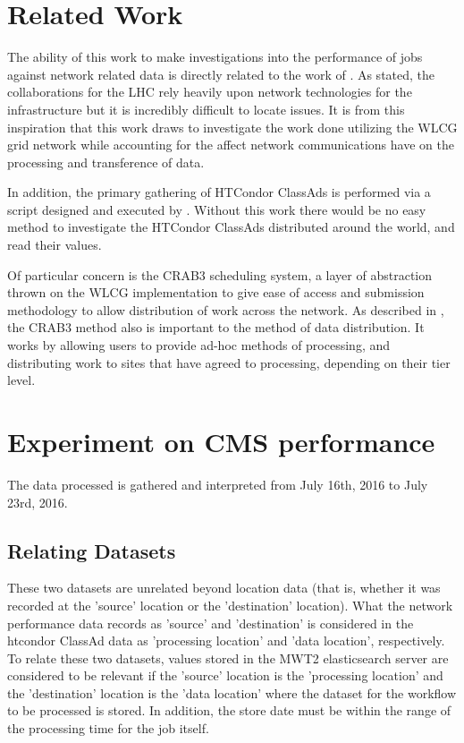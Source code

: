 \documentclass[sigconf]{acmart}
\begin{document}
\section{Related Work}
The ability of this work to make investigations into the performance of jobs against network related data is directly related to the work of \cite{shawn}. As stated, the collaborations for the LHC rely heavily upon network technologies for the infrastructure but it is incredibly difficult to locate issues. It is from this inspiration that this work draws to investigate the work done utilizing the WLCG grid network while accounting for the affect network communications have on the processing and transference of data.

In addition, the primary gathering of HTCondor ClassAds is performed via a script designed and executed by \cite{brian}. Without this work there would be no easy method to investigate the HTCondor ClassAds distributed around the world, and read their values.

Of particular concern is the CRAB3 scheduling system, a layer of abstraction thrown on the WLCG implementation to give ease of access and submission methodology to allow distribution of work across the network. As described in \cite{crab}, the CRAB3 method also is important to the method of data distribution. It works by allowing users to provide ad-hoc methods of processing, and distributing work to sites that have agreed to processing, depending on their tier level.
\section{Experiment on CMS performance}
The data processed is gathered and interpreted from July 16th, 2016 to July 23rd, 2016.
\subsection{Relating Datasets}
These two datasets are unrelated beyond location data (that is, whether it was recorded at the 'source' location or the 'destination' location). What the network performance data records as 'source' and 'destination' is considered in the htcondor ClassAd data as 'processing location' and 'data location', respectively. To relate these two datasets, values stored in the MWT2 elasticsearch server are considered to be relevant if the 'source' location is the 'processing location' and the 'destination' location is the 'data location' where the dataset for the workflow to be processed is stored. In addition, the store date must be within the range of the processing time for the job itself. 
\end{document}
